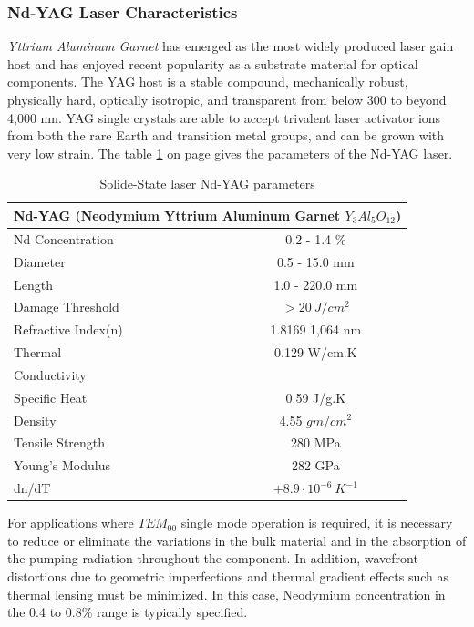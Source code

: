 \subsubsection{Nd-YAG Laser Characteristics}
\label{nd_yag}
\textit{Yttrium Aluminum Garnet} has emerged as the most widely produced laser gain host and has enjoyed recent popularity as a substrate material for optical components. The YAG host is a stable compound, mechanically robust, physically hard, optically isotropic, and transparent from below 300 to beyond 4,000 nm. YAG single crystals are able to accept trivalent laser activator ions from both the rare Earth and transition metal groups, and can be grown with very low strain. The table \ref{tab:ndyag_parameters} on page \pageref{tab:ndyag_parameters} gives the parameters of the Nd-YAG laser.

\begin{table}[ht!]
\centering
\begin{tabular}{|l|c|}
\hline
  \multicolumn{2}{|c|}{Nd-YAG (Neodymium Yttrium Aluminum Garnet $Y_3Al_5O_{12}$)}\\\hline
  Nd Concentration & 0.2 - 1.4 \% \\
  Diameter & 0.5 - 15.0 mm \\
  Length & 1.0 - 220.0 mm \\
  Damage Threshold & $> 20\ J/cm^2$  \\
  Refractive Index(n) & 1.8169 \@ 1,064 nm \\
  Thermal & 0.129 W/cm.K \\
  Conductivity & \\
  Specific Heat & 0.59 J/g.K\\
  Density & 4.55 $gm/cm^2$\\
  Tensile Strength & 280 MPa \\
  Young's Modulus & 282 GPa\\
  dn/dT & $+8.9\cdot10^{-6}\ K^{-1}$\\\hline
\end{tabular}
\caption{Solide-State laser Nd-YAG parameters}
\label{tab:ndyag_parameters}
\end{table}

For applications where $TEM_{00}$ single mode operation is required, it is necessary to reduce or eliminate the variations in the bulk material and in the absorption of the pumping radiation throughout the component. In addition, wavefront distortions due to geometric imperfections and thermal gradient effects such as thermal lensing must be minimized. In this case, Neodymium concentration in the 0.4 to 0.8\% range is typically specified.

